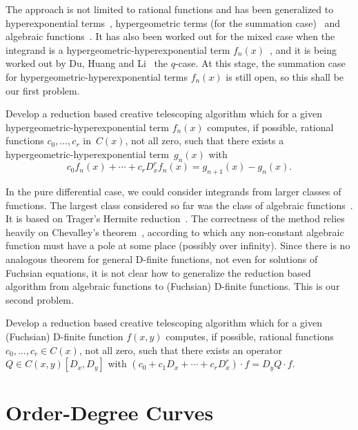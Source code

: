 \documentclass{jssc}
\begin{document}
 The approach is not limited to rational functions and has been generalized to
 hyperexponential terms~\cite{bostan13a}, hypergeometric terms (for the summation
 case)~\cite{chen15a,huang16} and algebraic functions~\cite{chen16a}. It has also been worked
 out for the mixed case when the integrand is a hyper\-geo\-metric-hyper\-expo\-nen\-tial
 term $f_n(x)$~\cite{bostan16},
 and it is being worked out by Du, Huang and Li~\cite{li16}
 the $q$-case. At this stage, the summation case for hypergeometric-hyperexponential
 terms $f_n(x)$ is still open, so this shall be our first problem.

 \begin{problem}
   Develop a reduction based creative telescoping algorithm which for a given hypergeometric-hyperexponential
   term $f_n(x)$ computes, if possible, rational functions $c_0,\dots,c_r$ in~$C(x)$, not all zero,
   such that there exists a hypergeometric-hyperexponential term~$g_n(x)$ with
   \[
    c_0 f_n(x) + \cdots + c_r D_x^r f_n(x) = g_{n+1}(x) - g_n(x).
   \]
 \end{problem}

 In the pure differential case, we could consider integrands from larger classes of
 functions. The largest class considered so far was the class of algebraic functions~\cite{chen16a}.
 It is based on Trager's Hermite reduction~\cite{trager84,bronstein98}. The correctness of the method relies
 heavily on Chevalley's theorem~\cite{chevalley51}, according to which any non-constant algebraic function must
 have a pole at some place (possibly over infinity). Since there is no analogous theorem
 for general D-finite functions, not even for solutions of Fuchsian equations, it is not clear
 how to generalize the reduction based algorithm from algebraic functions to (Fuchsian) D-finite
 functions. This is our second problem.

 \begin{problem}
   Develop a reduction based creative telescoping algorithm which for a given (Fuchsian) D-finite
   function $f(x,y)$ computes, if possible, rational functions $c_0,\dots,c_r\in C(x)$, not all zero, such
   that there exists an operator $Q\in C(x,y)[D_x,D_y]$ with $(c_0+c_1D_x+\cdots+c_rD_x^r)\cdot f = D_y Q\cdot f$.
 \end{problem}

 \section{Order-Degree Curves}
\end{document}
